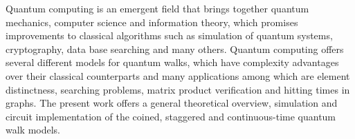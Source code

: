 \documentclass[../../dissertation.tex]{subfiles}
\begin{document}
Quantum computing is an emergent field that brings together quantum mechanics,
computer science and information theory, which promises improvements to
classical algorithms such as simulation of quantum systems, cryptography, data
base searching and many others. Quantum computing offers several different
models for quantum walks, which have complexity advantages over their classical
counterparts and many applications among which are element distinctness, searching
problems, matrix product verification and hitting times in graphs. The present
work offers a general theoretical overview, simulation and circuit
implementation of the coined, staggered and continuous-time quantum walk
models.
\end{document}
